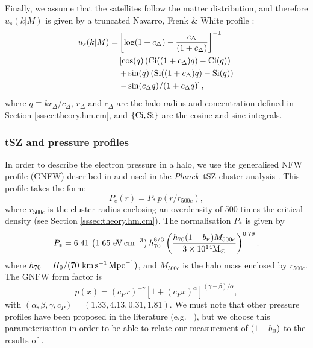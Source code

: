 \documentclass[useAMS,usenatbib]{mn2e}
\def\bH{b_{\scriptscriptstyle\rm H}}
\def\planck{{\it Planck\/}}
\def\citejap#1{\citeauthor{#1}\ \citeyear{#1}}
\begin{document}
      Finally, we assume that the satellites follow the matter distribution, and therefore $u_s(k|M)$ is given by a truncated Navarro, Frenk \& White profile \citep{1996ApJ...462..563N}:
      \begin{align}
        u_s(k|M)=&\left[\log(1+c_\Delta)-\frac{c_\Delta}{(1+c_\Delta)}\right]^{-1}\\\nonumber
               &\left[\cos(q)\left({\rm Ci}((1+c_\Delta)q)-{\rm Ci}(q)\right)\right.\\\nonumber
               &\left.+\sin(q)\left({\rm Si}((1+c_\Delta)q)-{\rm Si}(q)\right)\right.\\\nonumber
               &\left.-\sin(c_\Delta q)/(1+c_\Delta q)\right],
      \end{align}
      where $q\equiv kr_\Delta/c_\Delta$, $r_\Delta$ and $c_\Delta$ are the halo radius and concentration defined in Section \ref{sssec:theory.hm.cm}, and $\{{\rm Ci}, {\rm Si}\}$ are the cosine and sine integrals.
      
    \subsubsection{tSZ and pressure profiles}\label{sssec:theory.hm.pe}
      In order to describe the electron pressure in a halo, we use the generalised NFW profile (GNFW) described in \cite{2010A&A...517A..92A} and used in the \planck\ tSZ cluster analysis \citep{2016A&A...594A..24P}. This profile takes the form:
      \begin{equation}
        P_e(r)=P_*\,p(r/r_{500c}),
      \end{equation}
      where $r_{500c}$ is the cluster radius enclosing an overdensity of 500 times the critical density (see Section \ref{sssec:theory.hm.cm}). The normalisation $P_*$ is given by
      \begin{equation}\label{eq:arnaud_norm}
        P_*=6.41\,\left(1.65\,\, {\rm eV}\,{\rm cm}^{-3}\right)h_{70}^{8/3}
        \left(\frac{h_{70}(1-\bH)M_{500c}}{3\times10^{14}{\rm M_\odot}}\right)^{0.79},
      \end{equation}
      where $h_{70}=H_0/(70\ {\rm km}\,{\rm s}^{-1}\,{\rm Mpc}^{-1})$, and $M_{500c}$ is the halo mass enclosed by $r_{500c}$. The GNFW form factor is
      \begin{equation}
        p(x)=(c_P x)^{-\gamma}\left[1+(c_P x)^\alpha\right]^{(\gamma-\beta)/\alpha},
      \end{equation}
      with $(\alpha,\beta,\gamma,c_P)=(1.33,4.13,0.31,1.81)$. We must note that other pressure profiles have been proposed in the literature (e.g. \citejap{2012ApJ...758...75B}), but we choose this parameterisation in order to be able to relate our measurement of $(1-\bH)$ to the results of \cite{2016A&A...594A..24P}.
      
\end{document}
